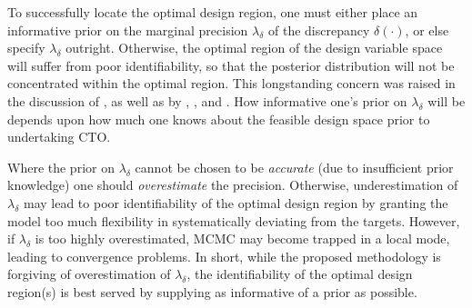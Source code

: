 \documentclass[12pt]{article}
\begin{document}
%
To successfully locate the optimal design region, one must either place an informative prior on the marginal precision $\lambda_\delta$ of the discrepancy $\delta(\cdot)$, or else specify $\lambda_\delta$ outright. 
%
Otherwise, the optimal region of the design variable space will suffer from poor identifiability, so that the posterior distribution will not be concentrated within the optimal region.
%
This longstanding concern was raised in the discussion of \cite{Kennedy2001}, as well as by \cite{Bayarri2007}, \cite{Tuo2015}, and \cite{Plumlee2017}.
%
How informative one's prior on $\lambda_\delta$ will be depends upon how much one knows about the feasible design space prior to undertaking CTO.
%
%

Where the prior on $\lambda_\delta$ cannot be chosen to be \emph{accurate} (due to insufficient prior knowledge) one should \emph{overestimate} the precision.
%
Otherwise, underestimation of $\lambda_\delta$ may lead to poor identifiability of the optimal design region by granting the model too much flexibility in systematically deviating from the targets.
%
%
%
%
%
%
However, if $\lambda_\delta$ is too highly overestimated, MCMC may become trapped in a local mode, leading to convergence problems. 
%
In short, while the proposed methodology is forgiving of overestimation of $\lambda_\delta$, the identifiability of the optimal design region(s) is best served by supplying as informative of a prior as possible. 
\end{document}
